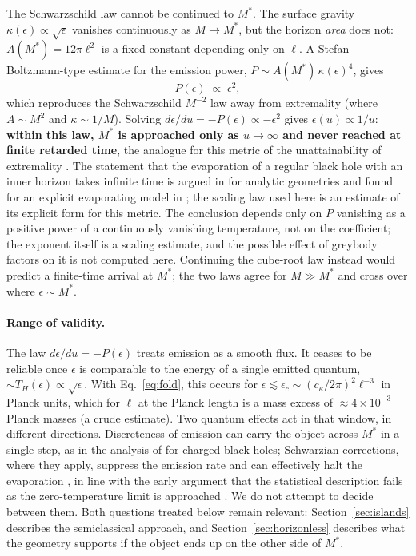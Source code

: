 \documentclass[11pt]{article}
\begin{document}
The Schwarzschild law cannot be continued to $M^*$. The surface gravity $\kappa(\epsilon)\propto\sqrt\epsilon$ vanishes continuously as $M\to M^*$, but the horizon \emph{area} does not: $A(M^*)=12\pi\ell^2$ is a fixed constant depending only on $\ell$. A Stefan--Boltzmann-type estimate for the emission power, $P\sim A(M^*)\,\kappa(\epsilon)^4$, gives
\begin{equation}
P(\epsilon)\;\propto\;\epsilon^2,
\end{equation}
which reproduces the Schwarzschild $M^{-2}$ law away from extremality (where $A\sim M^2$ and $\kappa\sim1/M$). Solving $d\epsilon/du=-P(\epsilon)\propto-\epsilon^2$ gives $\epsilon(u)\propto1/u$: \textbf{within this law, $M^*$ is approached only as $u\to\infty$ and never reached at finite retarded time}, the analogue for this metric of the unattainability of extremality \citep{SorkinPiran2001}. The statement that the evaporation of a regular black hole with an inner horizon takes infinite time is argued in \citet{CarballoRubio2018} for analytic geometries and found for an explicit evaporating model in \citet{Bonanno2023}; the scaling law used here is an estimate of its explicit form for this metric. The conclusion depends only on $P$ vanishing as a positive power of a continuously vanishing temperature, not on the coefficient; the exponent itself is a scaling estimate, and the possible effect of greybody factors on it is not computed here. Continuing the cube-root law instead would predict a finite-time arrival at $M^*$; the two laws agree for $M\gg M^*$ and cross over where $\epsilon\sim M^*$.

\paragraph{Range of validity.}
The law $d\epsilon/du=-P(\epsilon)$ treats emission as a smooth flux. It ceases to be reliable once $\epsilon$ is comparable to the energy of a single emitted quantum, $\sim T_H(\epsilon)\propto\sqrt\epsilon$. With Eq.~\eqref{eq:fold}, this occurs for $\epsilon\lesssim\epsilon_c\sim(c_\kappa/2\pi)^2\ell^{-3}$ in Planck units, which for $\ell$ at the Planck length is a mass excess of $\approx4\times10^{-3}$ Planck masses (a crude estimate). Two quantum effects act in that window, in different directions. Discreteness of emission can carry the object across $M^*$ in a single step, as in the analysis of \citet{Gralla2026} for charged black holes; Schwarzian corrections, where they apply, suppress the emission rate and can effectively halt the evaporation \citep{IliesiuTuriaci2021,Brown2026}, in line with the early argument that the statistical description fails as the zero-temperature limit is approached \citep{Preskill1991}. We do not attempt to decide between them. Both questions treated below remain relevant: Section~\ref{sec:islands} describes the semiclassical approach, and Section~\ref{sec:horizonless} describes what the geometry supports if the object ends up on the other side of $M^*$.
\end{document}
